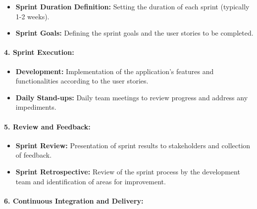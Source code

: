 \documentclass[unnumsec,webpdf,contemporary,large]{oup-authoring-template}%
\theoremstyle{thmstyleone}%
\theoremstyle{thmstyletwo}%
\theoremstyle{thmstylethree}%
\begin{document}
\begin{itemize}
    \item \textbf{Sprint Duration Definition:} Setting the duration of each sprint (typically 1-2 weeks).
    \vspace{0.1cm}
    \item \textbf{Sprint Goals:} Defining the sprint goals and the user stories to be completed.
\end{itemize}
\vspace{0.1cm}

\paragraph{4. Sprint Execution:}
\vspace{0.2cm}

\begin{itemize}
    \item \textbf{Development:} Implementation of the application's features and functionalities according to the user stories.
    \vspace{0.1cm}
    \item \textbf{Daily Stand-ups:} Daily team meetings to review progress and address any impediments.
\end{itemize}
\vspace{0.1cm}

\paragraph{5. Review and Feedback:}
\vspace{0.2cm}

\begin{itemize}
    \item \textbf{Sprint Review:} Presentation of sprint results to stakeholders and collection of feedback.
    \vspace{0.1cm}
    \item \textbf{Sprint Retrospective:} Review of the sprint process by the development team and identification of areas for improvement.
\end{itemize}
\vspace{0.1cm}

\paragraph{6. Continuous Integration and Delivery:}
\vspace{0.2cm}
\end{document}
